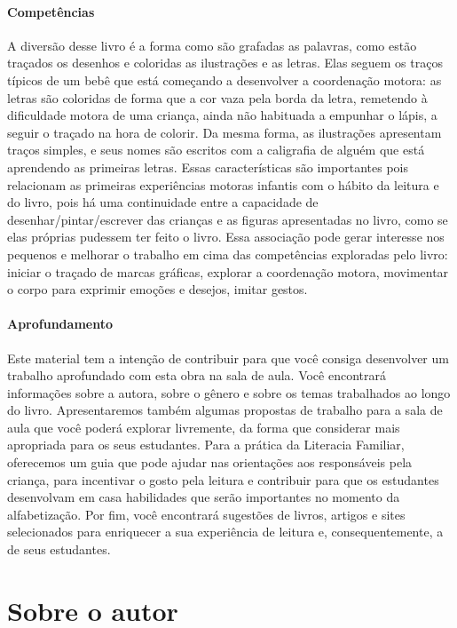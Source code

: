 \documentclass[11pt]{extarticle}
\begin{document}
\paragraph{Competências} A diversão desse livro é a forma como são grafadas as palavras, como estão traçados os desenhos e coloridas as ilustrações e as letras. Elas seguem os traços típicos de um bebê que está começando a desenvolver a coordenação motora: as letras são coloridas de forma que a cor vaza pela borda da letra, remetendo à dificuldade motora de uma criança, ainda não habituada a empunhar o lápis, a seguir o traçado na hora de colorir. Da mesma forma, as ilustrações apresentam traços simples, e seus nomes são escritos com a caligrafia de alguém que está aprendendo as primeiras letras. Essas características são importantes pois relacionam as primeiras experiências motoras infantis com o hábito da leitura e do livro, pois há uma continuidade entre a capacidade de desenhar/pintar/escrever das crianças e as figuras apresentadas no livro, como se elas próprias pudessem ter feito o livro. Essa associação pode gerar interesse nos pequenos e melhorar o trabalho em cima das competências exploradas pelo livro: iniciar o traçado de marcas gráficas, explorar a coordenação motora, movimentar o corpo para exprimir emoções e desejos, imitar gestos.

\paragraph{Aprofundamento} Este material tem a 
intenção de contribuir para que você consiga desenvolver um trabalho aprofundado 
com esta obra na sala de aula. Você encontrará informações sobre a autora, sobre 
o gênero e sobre os temas trabalhados ao longo do livro. Apresentaremos também 
algumas propostas de trabalho para a sala de aula que você poderá explorar livremente, 
da forma que considerar mais apropriada para os seus estudantes. Para a prática 
da Literacia Familiar, oferecemos um guia que pode ajudar nas orientações aos 
responsáveis pela criança, para incentivar o gosto pela leitura e contribuir para 
que os estudantes desenvolvam em casa habilidades que serão importantes no momento 
da alfabetização. Por fim, você encontrará sugestões de livros, artigos e sites 
selecionados para enriquecer a sua experiência de leitura e, 
consequentemente, a de seus estudantes.



\section{Sobre o autor}
\end{document}
